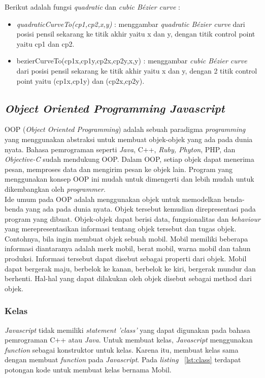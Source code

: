 Berikut adalah fungsi \textit{quadratic} dan \textit{cubic B\'ezier curve} :
\begin{itemize}
	\item \textit{quadraticCurveTo(cp1,cp2,x,y)} : menggambar \textit{quadratic B\'ezier curve} dari posisi pensil sekarang ke titik akhir yaitu x dan y, dengan titik control point yaitu cp1 dan cp2.
	\item bezierCurveTo(cp1x,cp1y,cp2x,cp2y,x,y) : menggambar \textit{cubic B\'ezier curve} dari posisi pensil sekarang ke titik akhir yaitu x dan y, dengan 2 titik control point yaitu (cp1x,cp1y) dan (cp2x,cp2y).
\end{itemize}

\subsection{\textit{Object Oriented Programming Javascript}}
OOP (\textit{Object Oriented Programming}) adalah sebuah paradigma \textit{programming} yang menggunakan abstraksi untuk membuat objek-objek yang ada pada dunia nyata. Bahasa pemrograman seperti \textit{Java}, C++, \textit{Ruby, Phyton}, PHP, dan \textit{Objective-C} sudah mendukung OOP. Dalam OOP, setiap objek dapat menerima pesan, memproses data dan mengirim pesan ke objek lain. Program yang menggunakan konsep OOP ini mudah untuk dimengerti dan lebih mudah untuk dikembangkan oleh \textit{programmer}. \\

Ide umum pada OOP adalah menggunakan objek untuk memodelkan benda-benda yang ada pada dunia nyata. Objek tersebut kemudian direpresentasi pada program yang dibuat. Objek-objek dapat berisi data, fungsionalitas dan \textit{behaviour} yang merepresentasikan informasi tentang objek tersebut dan tugas objek. Contohnya, bila ingin membuat objek sebuah mobil. Mobil memiliki beberapa informasi diantaranya adalah merk mobil, berat mobil, warna mobil dan tahun produksi. Informasi tersebut dapat disebut sebagai properti dari objek. Mobil dapat bergerak maju, berbelok ke kanan, berbelok ke kiri, bergerak mundur dan berhenti. Hal-hal yang dapat dilakukan oleh objek disebut sebagai method dari objek. 

\subsubsection{Kelas}
\textit{Javascript} tidak memiliki \textit{statement 'class'} yang dapat digunakan pada bahasa pemrograman C++ atau \textit{Java}. Untuk membuat kelas, \textit{Javascript} menggunakan \textit{function} sebagai konstruktor untuk kelas. Karena itu, membuat kelas sama dengan membuat \textit{function} pada \textit{Javascript}. Pada \textit{listing} ~\ref{lst:class} terdapat potongan kode untuk membuat kelas bernama Mobil.

